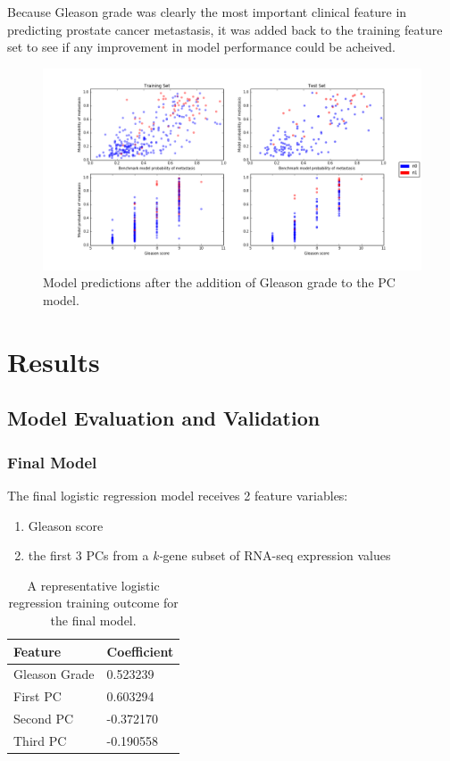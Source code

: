 \documentclass[final]{article}
\begin{document}
Because Gleason grade was clearly the most important clinical feature in predicting
prostate cancer metastasis, it was added back to the training feature set to see
if any improvement in model performance could be acheived.

\begin{figure}[h!]
  \centering
  \includegraphics[width=\textwidth]{PC3Gleason}
  \caption{\label{fig:PC3GG}Model predictions after the addition of Gleason grade to the PC model.}
\end{figure}


\section{Results}

\subsection{Model Evaluation and Validation}

\subsubsection{Final Model}

The final logistic regression model receives 2 feature variables:

\begin{enumerate}
\item Gleason score
\item the first 3 PCs from a \textit{k-}gene subset of RNA-seq expression values
\end{enumerate}

\begin{table}
  \centering
  \caption{\label{tab:FFcoefs} A representative logistic regression training outcome for the final model.}
    \begin{tabular}{l l}
      \hline
      Feature & Coefficient \\ \hline
      Gleason Grade & 0.523239  \\
      First PC & 0.603294 \\
      Second PC & -0.372170  \\
      Third PC &  -0.190558 \\
      \hline
    \end{tabular}
\end{table}
\end{document}
